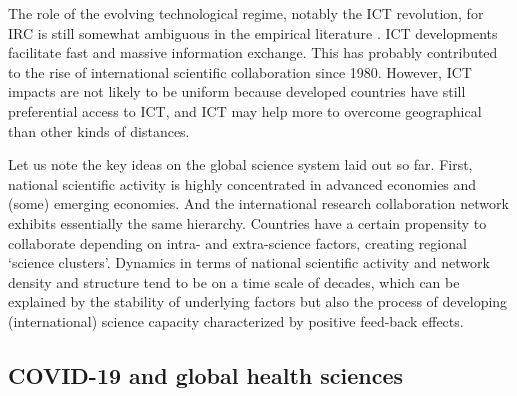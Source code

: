 The role of the evolving technological regime, notably the ICT revolution, for IRC is still somewhat ambiguous in the empirical literature \citep[and the literature cited therein]{gui2018international}. ICT developments facilitate fast and massive information exchange. This has probably contributed to the rise of international scientific collaboration since 1980. However, ICT impacts are not likely to be uniform because developed countries have still preferential access to ICT, and ICT may help more to overcome geographical than other kinds of distances. 

Let us note the key ideas on the global science system laid out so far. First, national scientific activity is highly concentrated in advanced economies and (some) emerging economies. And the international research collaboration network exhibits essentially the same hierarchy. Countries have a certain propensity to collaborate depending on intra- and extra-science factors, creating regional `science clusters'. Dynamics in terms of national scientific activity and network density and structure tend to be on a time scale of decades, which can be explained by the stability of underlying factors but also the process of developing (international) science capacity characterized by positive feed-back effects.


\subsection{COVID-19 and global health sciences}

